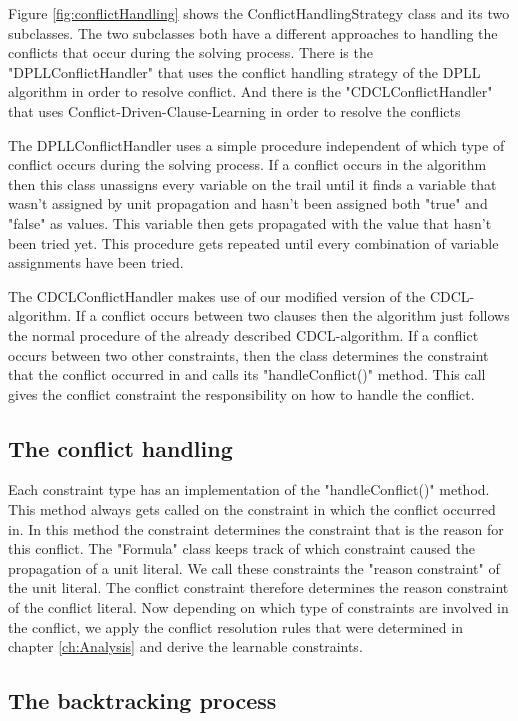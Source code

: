 Figure \ref{fig:conflictHandling} shows the ConflictHandlingStrategy class and its two subclasses. The two subclasses both have a different approaches to handling the conflicts that occur during the solving process. There is the "DPLLConflictHandler" that uses the conflict handling strategy of the DPLL algorithm in order to resolve conflict. And there is the "CDCLConflictHandler" that uses Conflict-Driven-Clause-Learning in order to resolve the conflicts
\par
The DPLLConflictHandler uses a simple procedure independent of which type of conflict occurs during the solving process. If a conflict occurs in the algorithm then this class unassigns every variable on the trail until it finds a variable that wasn't assigned by unit propagation and hasn't been assigned both "true" and "false" as values. This variable then gets propagated with the value that hasn't been tried yet. This procedure gets repeated until every combination of variable assignments have been tried.
\par
The CDCLConflictHandler makes use of our modified version of the CDCL-algorithm. If a conflict occurs between two clauses then the algorithm just follows the normal procedure of the already described CDCL-algorithm. If a conflict occurs between two other constraints, then the class determines the constraint that the conflict occurred in and calls its "handleConflict()" method. This call gives the conflict constraint the responsibility on how to handle the conflict.

\subsection{The conflict handling}

Each constraint type has an implementation of the "handleConflict()" method. This method always gets called on the constraint in which the conflict occurred in. In this method the constraint determines the constraint that is the reason for this conflict. The "Formula" class keeps track of which constraint caused the propagation of a unit literal. We call these constraints the "reason constraint" of the unit literal. The conflict constraint therefore determines the reason constraint of the conflict literal. Now depending on which type of constraints are involved in the conflict, we apply the conflict resolution rules that were determined in chapter \ref{ch:Analysis} and derive the learnable constraints.

\subsection{The backtracking process}

